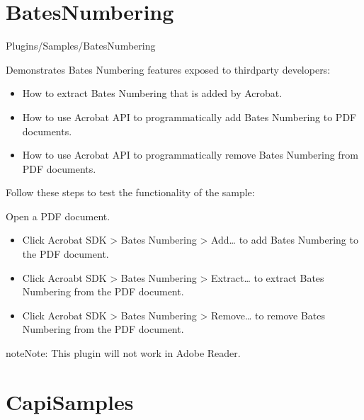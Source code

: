 \documentclass[letterpaper,12pt,english,openany,oneside]{sphinxmanual}
\begin{document}
\section{BatesNumbering}
\label{\detokenize{Samples_Plug_in:batesnumbering}}\label{\detokenize{Samples_Plug_in:location-1}}

Plugins/Samples/BatesNumbering

\label{\detokenize{Samples_Plug_in:description-1}}

Demonstrates Bates Numbering features exposed to third\sphinxhyphen{}party developers:
\begin{itemize}
\item {} 
How to extract Bates Numbering that is added by Acrobat.

\item {} 
How to use Acrobat API to programmatically add Bates Numbering to PDF documents.

\item {} 
How to use Acrobat API to programmatically remove Bates Numbering from PDF documents.

\end{itemize}


Follow these steps to test the functionality of the sample:

Open a PDF document.
\begin{itemize}
\item {} 
Click Acrobat SDK > Bates Numbering > Add… to add Bates Numbering to the PDF document.

\item {} 
Click Acroabt SDK > Bates Numbering > Extract… to extract Bates Numbering from the PDF document.

\item {} 
Click Acrobat SDK > Bates Numbering > Remove… to remove Bates Numbering from the PDF document.

\end{itemize}

\begin{sphinxadmonition}{note}{Note:}
This plugin will not work in Adobe Reader.
\end{sphinxadmonition}


\section{CapiSamples}
\label{\detokenize{Samples_Plug_in:capisamples}}\label{\detokenize{Samples_Plug_in:location-2}}
\end{document}
